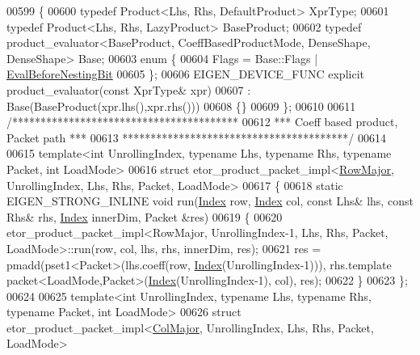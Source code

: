 \begin{DoxyCode}
00599 \{
00600   \textcolor{keyword}{typedef} Product<Lhs, Rhs, DefaultProduct> XprType;
00601   \textcolor{keyword}{typedef} Product<Lhs, Rhs, LazyProduct> BaseProduct;
00602   \textcolor{keyword}{typedef} product\_evaluator<BaseProduct, CoeffBasedProductMode, DenseShape, DenseShape> Base;
00603   \textcolor{keyword}{enum} \{
00604     Flags = Base::Flags | \hyperlink{group__flags_gaa34e83bae46a8eeae4e69ebe3aaecbed}{EvalBeforeNestingBit}
00605   \};
00606   EIGEN\_DEVICE\_FUNC \textcolor{keyword}{explicit} product\_evaluator(\textcolor{keyword}{const} XprType& xpr)
00607     : Base(BaseProduct(xpr.lhs(),xpr.rhs()))
00608   \{\}
00609 \};
00610 
00611 \textcolor{comment}{/****************************************}
00612 \textcolor{comment}{*** Coeff based product, Packet path  ***}
00613 \textcolor{comment}{****************************************/}
00614 
00615 \textcolor{keyword}{template}<\textcolor{keywordtype}{int} UnrollingIndex, \textcolor{keyword}{typename} Lhs, \textcolor{keyword}{typename} Rhs, \textcolor{keyword}{typename} Packet, \textcolor{keywordtype}{int} LoadMode>
00616 \textcolor{keyword}{struct }etor\_product\_packet\_impl<\hyperlink{group__enums_ggaacded1a18ae58b0f554751f6cdf9eb13acfcde9cd8677c5f7caf6bd603666aae3}{RowMajor}, UnrollingIndex, Lhs, Rhs, Packet, LoadMode>
00617 \{
00618   \textcolor{keyword}{static} EIGEN\_STRONG\_INLINE \textcolor{keywordtype}{void} run(\hyperlink{namespace_eigen_a62e77e0933482dafde8fe197d9a2cfde}{Index} row, \hyperlink{namespace_eigen_a62e77e0933482dafde8fe197d9a2cfde}{Index} col, \textcolor{keyword}{const} Lhs& lhs, \textcolor{keyword}{const} Rhs& rhs, 
      \hyperlink{namespace_eigen_a62e77e0933482dafde8fe197d9a2cfde}{Index} innerDim, Packet &res)
00619   \{
00620     etor\_product\_packet\_impl<RowMajor, UnrollingIndex-1, Lhs, Rhs, Packet, LoadMode>::run(row, col, lhs, 
      rhs, innerDim, res);
00621     res =  pmadd(pset1<Packet>(lhs.coeff(row, \hyperlink{namespace_eigen_a62e77e0933482dafde8fe197d9a2cfde}{Index}(UnrollingIndex-1))), rhs.template 
      packet<LoadMode,Packet>(\hyperlink{namespace_eigen_a62e77e0933482dafde8fe197d9a2cfde}{Index}(UnrollingIndex-1), col), res);
00622   \}
00623 \};
00624 
00625 \textcolor{keyword}{template}<\textcolor{keywordtype}{int} UnrollingIndex, \textcolor{keyword}{typename} Lhs, \textcolor{keyword}{typename} Rhs, \textcolor{keyword}{typename} Packet, \textcolor{keywordtype}{int} LoadMode>
00626 \textcolor{keyword}{struct }etor\_product\_packet\_impl<\hyperlink{group__enums_ggaacded1a18ae58b0f554751f6cdf9eb13a0cbd4bdd0abcfc0224c5fcb5e4f6669a}{ColMajor}, UnrollingIndex, Lhs, Rhs, Packet, LoadMode>

\end{DoxyCode}
